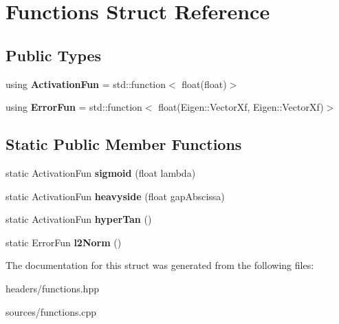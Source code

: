 \hypertarget{structFunctions}{}\section{Functions Struct Reference}
\label{structFunctions}
\subsection*{Public Types}
\begin{DoxyCompactItemize}
\item 
\mbox{\label{structFunctions_ad25362ffa52b2f7933431190546593ac}} 
using {\bfseries Activation\+Fun} = std\+::function$<$ float(float)$>$
\item 
\mbox{\label{structFunctions_a834bc4170f1caa8c77272ecf51dbae5c}} 
using {\bfseries Error\+Fun} = std\+::function$<$ float(Eigen\+::\+Vector\+Xf, Eigen\+::\+Vector\+Xf)$>$
\end{DoxyCompactItemize}
\subsection*{Static Public Member Functions}
\begin{DoxyCompactItemize}
\item 
\mbox{\label{structFunctions_a773de9cd59f7ccc3e2fe9822f0536ae4}} 
static Activation\+Fun {\bfseries sigmoid} (float lambda)
\item 
\mbox{\label{structFunctions_a683c495693f3e2a5ec55e30edaccfd2d}} 
static Activation\+Fun {\bfseries heavyside} (float gap\+Abscissa)
\item 
\mbox{\label{structFunctions_a0aac84382fccbc38cacccd566434d4a8}} 
static Activation\+Fun {\bfseries hyper\+Tan} ()
\item 
\mbox{\label{structFunctions_a00bac40f42bb6c47d25c0cd238c4275a}} 
static Error\+Fun {\bfseries l2\+Norm} ()
\end{DoxyCompactItemize}


The documentation for this struct was generated from the following files\+:\begin{DoxyCompactItemize}
\item 
headers/functions.\+hpp\item 
sources/functions.\+cpp\end{DoxyCompactItemize}
